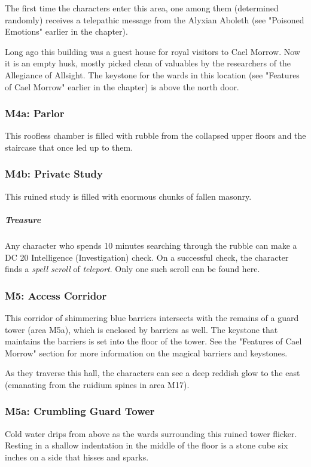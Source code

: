 \documentclass[10pt,a4paper,twoside,bg=print,twocolumn,openany,nodeprecatedcode]{dndbook}
\begin{document}
The first time the characters enter this area, one among them (determined randomly) receives a telepathic message from the Alyxian Aboleth (see "Poisoned Emotions" earlier in the chapter).

Long ago this building was a guest house for royal visitors to Cael Morrow. Now it is an empty husk, mostly picked clean of valuables by the researchers of the Allegiance of Allsight. The keystone for the wards in this location (see "Features of Cael Morrow" earlier in the chapter) is above the north door.

\subsubsection{M4a: Parlor}
This roofless chamber is filled with rubble from the collapsed upper floors and the staircase that once led up to them.

\subsubsection{M4b: Private Study}
This ruined study is filled with enormous chunks of fallen masonry.

\subparagraph{Treasure}
Any character who spends 10 minutes searching through the rubble can make a DC 20 Intelligence (Investigation) check. On a successful check, the character finds a \textit{spell scroll} of \textit{teleport}. Only one such scroll can be found here.

\subsubsection{M5: Access Corridor}
This corridor of shimmering blue barriers intersects with the remains of a guard tower (area M5a), which is enclosed by barriers as well. The keystone that maintains the barriers is set into the floor of the tower. See the "Features of Cael Morrow" section for more information on the magical barriers and keystones.

As they traverse this hall, the characters can see a deep reddish glow to the east (emanating from the ruidium spines in area M17).

\subsubsection{M5a: Crumbling Guard Tower}
\begin{DndReadAloud}{}
Cold water drips from above as the wards surrounding this ruined tower flicker. Resting in a shallow indentation in the middle of the floor is a stone cube six inches on a side that hisses and sparks.

\end{DndReadAloud}
\end{document}
